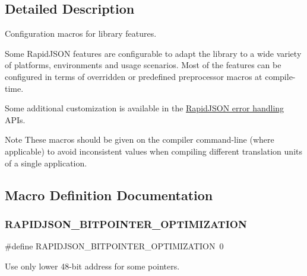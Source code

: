\subsection{Detailed Description}
Configuration macros for library features. 

Some Rapid\+J\+S\+ON features are configurable to adapt the library to a wide variety of platforms, environments and usage scenarios. Most of the features can be configured in terms of overridden or predefined preprocessor macros at compile-\/time.

Some additional customization is available in the \hyperlink{group__RAPIDJSON__ERRORS}{Rapid\+J\+S\+ON error handling} A\+P\+Is.

\begin{DoxyNote}{Note}
These macros should be given on the compiler command-\/line (where applicable) to avoid inconsistent values when compiling different translation units of a single application. 
\end{DoxyNote}


\subsection{Macro Definition Documentation}
\mbox{\label{group__RAPIDJSON__CONFIG_ga93fb983f78208d12c822376e1ea6d185}} 
\subsubsection{\texorpdfstring{R\+A\+P\+I\+D\+J\+S\+O\+N\+\_\+B\+I\+T\+P\+O\+I\+N\+T\+E\+R\+\_\+\+O\+P\+T\+I\+M\+I\+Z\+A\+T\+I\+ON}{RAPIDJSON\_48BITPOINTER\_OPTIMIZATION}}
{\footnotesize\ttfamily \#define R\+A\+P\+I\+D\+J\+S\+O\+N\+\_\+B\+I\+T\+P\+O\+I\+N\+T\+E\+R\+\_\+\+O\+P\+T\+I\+M\+I\+Z\+A\+T\+I\+ON~0}



Use only lower 48-\/bit address for some pointers. 

